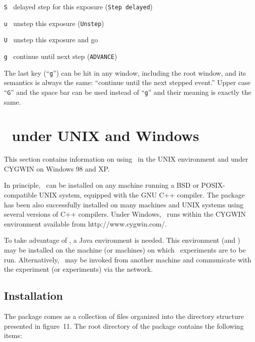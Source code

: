 \noindent
{\tt S~} delayed step for this exposure ({\tt Step~delayed})

\noindent
{\tt u~} unstep this exposure ({\tt Unstep})

\noindent
{\tt U~} unstep this exposure and go

\noindent
{\tt g~} continue until next step ({\tt ADVANCE})

\medskip

The last key (``{\tt g}'') can be hit in any window, including the root window,
and its semantics is always the same: ``continue until the next stepped
event.''
Upper case ``{\tt G}'' and the space bar can be used instead of ``{\tt g}''
and their meaning is exactly the same.

\section{\smurph\ under UNIX and Windows}
\label{rm_un}

This section contains information on using \smurph\ in the UNIX
environment and under CYGWIN on Windows 98 and XP.

In principle, \smurph\ can be installed on any machine running
a BSD or POSIX-compatible UNIX system, equipped with the GNU C++ compiler.
The package has been also successfully installed on many machines
and UNIX systems using several versions of C++ compilers.
Under Windows, \smurph\ runs within the CYGWIN environment available
from {http://www.cygwin.com/}.

To take advantage of \dsd, a Java environment is needed.
This environment (and \dsd) may
be installed on the machine (or machines) on which
\smurph\ experiments are to be run.
Alternatively, \dsd\ may be invoked from another machine and communicate
with the experiment (or experiments) via the network.


\subsection{Installation}
\label{rm_un_in}

The package comes as a collection of files organized into the directory
structure presented in
figure~11.
The root directory of the package contains the following items:

